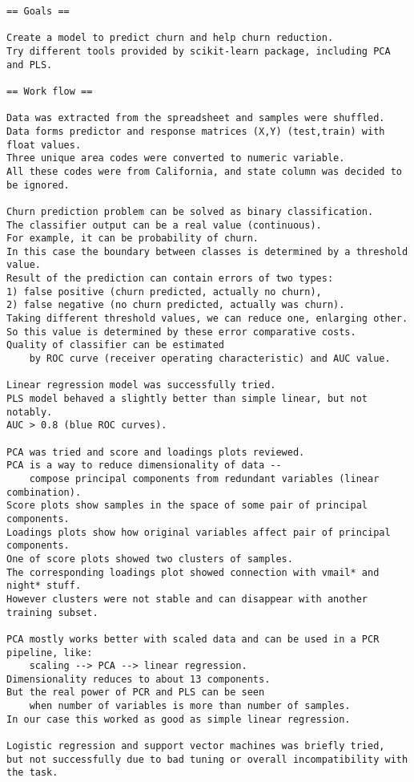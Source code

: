 \documentclass{article}
\begin{document}
\begin{verbatim}
== Goals ==

Create a model to predict churn and help churn reduction.
Try different tools provided by scikit-learn package, including PCA and PLS.

== Work flow ==

Data was extracted from the spreadsheet and samples were shuffled.
Data forms predictor and response matrices (X,Y) (test,train) with float values.
Three unique area codes were converted to numeric variable.
All these codes were from California, and state column was decided to be ignored.

Churn prediction problem can be solved as binary classification.
The classifier output can be a real value (continuous).
For example, it can be probability of churn.
In this case the boundary between classes is determined by a threshold value.
Result of the prediction can contain errors of two types:
1) false positive (churn predicted, actually no churn),
2) false negative (no churn predicted, actually was churn).
Taking different threshold values, we can reduce one, enlarging other.
So this value is determined by these error comparative costs.
Quality of classifier can be estimated 
    by ROC curve (receiver operating characteristic) and AUC value.

Linear regression model was successfully tried.
PLS model behaved a slightly better than simple linear, but not notably.
AUC > 0.8 (blue ROC curves).

PCA was tried and score and loadings plots reviewed.
PCA is a way to reduce dimensionality of data -- 
    compose principal components from redundant variables (linear combination).
Score plots show samples in the space of some pair of principal components.
Loadings plots show how original variables affect pair of principal components.
One of score plots showed two clusters of samples.
The corresponding loadings plot showed connection with vmail* and night* stuff.
However clusters were not stable and can disappear with another training subset.

PCA mostly works better with scaled data and can be used in a PCR pipeline, like:
    scaling --> PCA --> linear regression.
Dimensionality reduces to about 13 components.
But the real power of PCR and PLS can be seen 
    when number of variables is more than number of samples.
In our case this worked as good as simple linear regression.

Logistic regression and support vector machines was briefly tried, 
but not successfully due to bad tuning or overall incompatibility with the task.


\end{verbatim}
\end{document}
